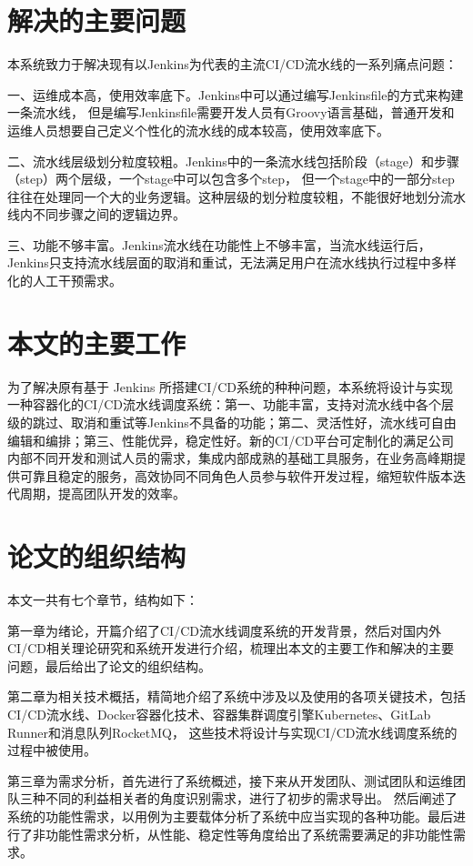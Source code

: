 \section{解决的主要问题}
本系统致力于解决现有以Jenkins为代表的主流CI/CD流水线的一系列痛点问题：

一、运维成本高，使用效率底下。Jenkins中可以通过编写Jenkinsfile的方式来构建一条流水线，
但是编写Jenkinsfile需要开发人员有Groovy语言基础，普通开发和运维人员想要自己定义个性化的流水线的成本较高，使用效率底下。

二、流水线层级划分粒度较粗。Jenkins中的一条流水线包括阶段（stage）和步骤（step）两个层级，一个stage中可以包含多个step，
但一个stage中的一部分step往往在处理同一个大的业务逻辑。这种层级的划分粒度较粗，不能很好地划分流水线内不同步骤之间的逻辑边界。

三、功能不够丰富。Jenkins流水线在功能性上不够丰富，当流水线运行后，Jenkins只支持流水线层面的取消和重试，无法满足用户在流水线执行过程中多样化的人工干预需求。


\section{本文的主要工作}

为了解决原有基于 Jenkins 所搭建CI/CD系统的种种问题，本系统将设计与实现一种容器化的CI/CD流水线调度系统：第一、功能丰富，支持对流水线中各个层级的跳过、取消和重试等Jenkins不具备的功能；第二、灵活性好，流水线可自由编辑和编排；第三、性能优异，稳定性好。新的CI/CD平台可定制化的满足公司内部不同开发和测试人员的需求，集成内部成熟的基础工具服务，在业务高峰期提供可靠且稳定的服务，高效协同不同角色人员参与软件开发过程，缩短软件版本迭代周期，提高团队开发的效率。

\section{论文的组织结构}
本文一共有七个章节，结构如下：

第一章为绪论，开篇介绍了CI/CD流水线调度系统的开发背景，然后对国内外CI/CD相关理论研究和系统开发进行介绍，梳理出本文的主要工作和解决的主要问题，最后给出了论文的组织结构。

第二章为相关技术概括，精简地介绍了系统中涉及以及使用的各项关键技术，包括CI/CD流水线、Docker容器化技术、容器集群调度引擎Kubernetes、GitLab Runner和消息队列RocketMQ，
这些技术将设计与实现CI/CD流水线调度系统的过程中被使用。

第三章为需求分析，首先进行了系统概述，接下来从开发团队、测试团队和运维团队三种不同的利益相关者的角度识别需求，进行了初步的需求导出。
然后阐述了系统的功能性需求，以用例为主要载体分析了系统中应当实现的各种功能。最后进行了非功能性需求分析，从性能、稳定性等角度给出了系统需要满足的非功能性需求。

